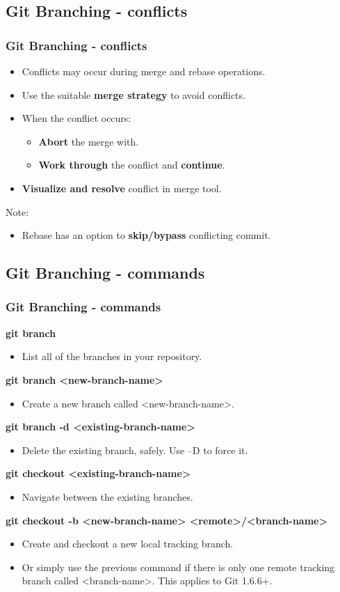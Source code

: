 \subsection[]{Git Branching - conflicts}
\begin{frame}
\frametitle{Git Branching - conflicts}
\begin{itemize}
	\item Conflicts may occur during merge and rebase operations.
	\item Use the suitable \textbf{merge strategy} to avoid conflicts.
	\item When the conflict occurs:
		\begin{itemize}
		\item \textbf{Abort} the merge with.
		\item \textbf{Work through} the conflict and \textbf{continue}.
		\end{itemize}
	\item \textbf{Visualize and resolve} conflict in merge tool.
\end{itemize}
Note:
\begin{itemize}
	\item Rebase has an option to \textbf{skip/bypass} conflicting commit.
\end{itemize}
\end{frame}

\subsection[]{Git Branching - commands}
\begin{frame}
\frametitle{Git Branching - commands}
\textbf{git branch}
	\begin{itemize}
	\item List all of the branches in your repository.
	\end{itemize}
\textbf{git branch <new-branch-name>}
	\begin{itemize}
	\item Create a new branch called <new-branch-name>.
	\end{itemize}
\textbf{git branch -d <existing-branch-name>}
	\begin{itemize}
	\item Delete the existing branch, safely. Use –D to force it.
	\end{itemize}
\textbf{git checkout <existing-branch-name>}
	\begin{itemize}
	\item Navigate between the existing branches.
	\end{itemize}
\textbf{git checkout -b <new-branch-name> <remote>/<branch-name>}
	\begin{itemize}
	\item Create and checkout a new local tracking branch.
	\item Or simply use the previous command if there is only one remote tracking branch called <branch-name>. This applies to Git 1.6.6+. 
	\end{itemize}
\end{frame}


